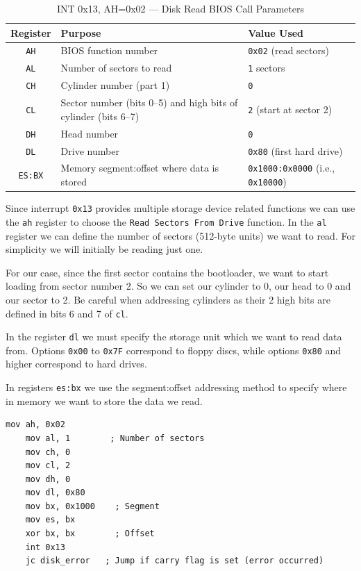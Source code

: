 \begin{table}[h]
    \centering
    \begin{tabular}{|c|p{5cm}|p{4cm}|}
    \hline
    \textbf{Register} & \textbf{Purpose} & \textbf{Value Used} \\ \hline
    \texttt{AH} & BIOS function number & \texttt{0x02} (read sectors) \\ \hline
    \texttt{AL} & Number of sectors to read & \texttt{1} sectors \\ \hline
    \texttt{CH} & Cylinder number (part 1) & \texttt{0} \\ \hline
    \texttt{CL} & Sector number (bits 0–5) and high bits of cylinder (bits 6–7) & \texttt{2} (start at sector 2) \\ \hline
    \texttt{DH} & Head number & \texttt{0} \\ \hline
    \texttt{DL} & Drive number & \texttt{0x80} (first hard drive) \\ \hline
    \texttt{ES:BX} & Memory segment:offset where data is stored & \texttt{0x1000:0x0000} (i.e., \texttt{0x10000}) \\ \hline
    \end{tabular}
    \caption{INT 0x13, AH=0x02 — Disk Read BIOS Call Parameters}
    \label{tab:disk_read_params}
\end{table}
    
Since interrupt \texttt{0x13} provides multiple storage device related functions we can use the \texttt{ah} register
to choose the \texttt{Read Sectors From Drive} function.
In the \texttt{al} register we can define the number of sectors (512-byte units) we want to read. For simplicity
we will initially be reading just one.

For our case, since the first sector contains the bootloader, we want to start loading from sector number 2.
So we can set our cylinder to 0, our head to 0 and our sector to 2. Be careful when addressing cylinders
as their 2 high bits are defined in bits 6 and 7 of \texttt{cl}.

In the register \texttt{dl} we must specify the storage unit which we want to read data from.
Options \texttt{0x00} to \texttt{0x7F} correspond to floppy discs, while options \texttt{0x80} and higher
correspond to hard drives.

In registers \texttt{es:bx} we use the segment:offset addressing method to specify where in memory we want
to store the data we read.

\begin{lstlisting}[caption={Assembly to load the kernel}]
    mov ah, 0x02
    mov al, 1        ; Number of sectors
    mov ch, 0
    mov cl, 2
    mov dh, 0
    mov dl, 0x80
    mov bx, 0x1000    ; Segment
    mov es, bx
    xor bx, bx        ; Offset
    int 0x13
    jc disk_error   ; Jump if carry flag is set (error occurred)
\end{lstlisting}

